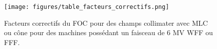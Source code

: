\documentclass{article}
\begin{document}
\begin{figure}[h]
  \centering
  \texttt{[image: figures/table\_facteurs\_correctifs.png]}
  \caption{Facteurs correctifs du FOC pour des champs collimater avec MLC ou cône pour des machines possédant un faisceau de 6 MV WFF ou FFF.}
  \label{fig_table_facteurs_correctifs}
\end{figure}

\clearpage


\nocite{*}
\end{document}
